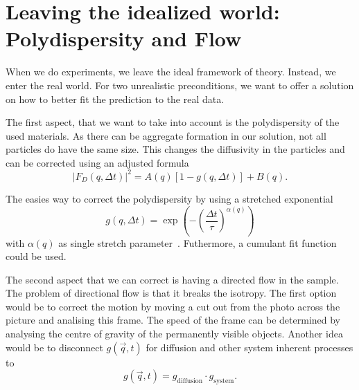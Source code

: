 \section[Polydispersity and Flow]{Leaving the idealized world: Polydispersity and Flow}
\label{sec:PoldysAndFlow}

When we do experiments, we leave the ideal framework of theory. Instead, we enter the real world. For two unrealistic 
preconditions, we want to offer a solution on how to better fit the prediction to the real data.

The first aspect, that we want to take into account is the polydispersity of the 
used materials. As there can be aggregate formation in our solution, not all particles do have the
same size. This changes the diffusivity in the particles and can be corrected using an adjusted 
formula 
\begin{equation}
    |F_D(q,\Delta t)|^2 = A(q)[1- g(q, \Delta t)] +B(q).
\end{equation}

The easies way to correct the polydispersity by using a stretched exponential
\begin{equation}
    g(q,\Delta t) = \exp(-\left(\frac{\Delta t}{\tau}\right)^{\alpha (q)})
\end{equation}
with $\alpha (q) $ as single stretch parameter~\cite{Wulstein.2016}. Futhermore, a cumulant fit function could be used.

The second aspect that we can correct is having a directed flow in the sample. The problem of directional flow is that it breaks the isotropy. 
The first option would be to correct the motion by moving a cut out from the photo across the picture and analising this 
frame. The speed of the frame can be determined by analysing the centre of gravity of the permanently visible objects. 
Another idea would be to disconnect $g(\vec{q}, t)$ for diffusion and other system inherent processes to 
\begin{equation}
    g(\vec{q}, t) = g_{\mathrm{diffusion}} \cdot g_{\mathrm{system}} .
\end{equation}